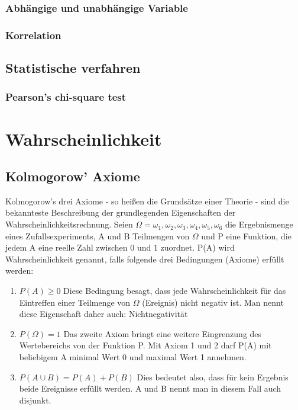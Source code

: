 \documentclass[letterpaper, titlepage]{article}
\begin{document}
\subsubsection{Abhängige und unabhängige Variable}\label{Abhängige und unabhängige Variable}

\subsubsection{Korrelation}\label{Korrelation}

\subsection{Statistische verfahren}\label{Statistische verfahren}

\subsubsection{Pearson's chi-square test}\label{Pearson's chi-square test}


\section{Wahrscheinlichkeit}\label{Wahrscheinlichkeit}


\subsection{Kolmogorow' Axiome}\label{Kolmogorow's Axiome}
Kolmogorow's drei Axiome - so heißen die Grundsätze einer Theorie - sind die bekannteste Beschreibung der grundlegenden Eigenschaften der Wahrscheinlichkeitsrechnung. Seien $\Omega={\omega_1, \omega_2, \omega_3, \omega_4, \omega_5, \omega_6}$ die Ergebnismenge eines Zufallsexperiments, A und B Teilmengen von $\Omega$ und P eine Funktion, die jedem A eine reelle Zahl zwischen 0 und 1 zuordnet. P(A) wird Wahrscheinlichkeit genannt, falls folgende drei Bedingungen (Axiome) erfüllt werden:
\begin{enumerate}
    \item $P(A)\geq0$ Diese Bedingung besagt, dass jede Wahrscheinlichkeit für das Eintreffen einer Teilmenge von $\Omega$ (Ereignis) nicht negativ ist. Man nennt diese Eigenschaft daher auch: Nichtnegativität
    \item $P(\Omega)=1$ Das zweite Axiom bringt eine weitere Eingrenzung des Wertebereichs von der Funktion P. Mit Axiom 1 und 2 darf P(A) mit beliebigem A minimal Wert 0 und maximal Wert 1 annehmen.
    \item $P(A \cup B)=P(A)+P(B)$ Dies bedeutet also, dass für kein Ergebnis beide Ereignisse erfüllt werden. A und B nennt man in diesem Fall auch disjunkt.
\end{enumerate}
\end{document}
